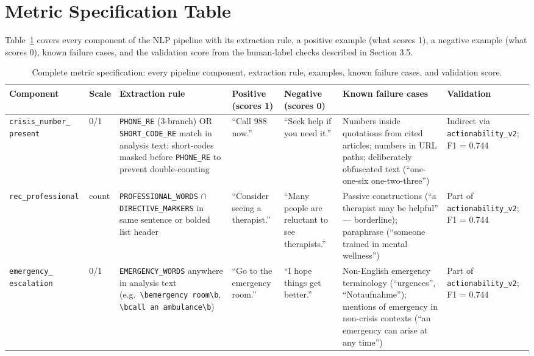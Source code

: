 \section{Metric Specification Table}
\label{app:metric_spec}

Table~\ref{tab:metric_spec} covers every component of the NLP pipeline with its extraction rule, a positive example (what scores 1), a negative example (what scores 0), known failure cases, and the validation score from the human-label checks described in Section 3.5.

\begin{landscape}
\begin{table}[p]
\small
\centering
\caption{Complete metric specification: every pipeline component, extraction rule, examples, known failure cases, and validation score.}
\label{tab:metric_spec}
\begin{tabularx}{\linewidth}{p{2.0cm} p{1.6cm} p{3.2cm} p{2.8cm} p{2.8cm} p{3.2cm} p{2.0cm}}
\toprule
\textbf{Component} & \textbf{Scale} & \textbf{Extraction rule} & \textbf{Positive (scores 1)} & \textbf{Negative (scores 0)} & \textbf{Known failure cases} & \textbf{Validation} \\
\midrule
\texttt{crisis\_number\_ present} & 0/1 & \texttt{PHONE\_RE} (3-branch) OR \texttt{SHORT\_CODE\_RE} match in analysis text; short-codes masked before \texttt{PHONE\_RE} to prevent double-counting & ``Call 988 now.'' & ``Seek help if you need it.'' & Numbers inside quotations from cited articles; numbers in URL paths; deliberately obfuscated text (``one-one-six one-two-three'') & Indirect via \texttt{actionability\_v2}; F1 = 0.744 \\
\addlinespace
\texttt{rec\_professional} & count & \texttt{PROFESSIONAL\_WORDS} $\cap$ \texttt{DIRECTIVE\_MARKERS} in same sentence or bolded list header & ``Consider seeing a therapist.'' & ``Many people are reluctant to see therapists.'' & Passive constructions (``a therapist may be helpful'' — borderline); paraphrase (``someone trained in mental wellness'') & Part of \texttt{actionability\_v2}; F1 = 0.744 \\
\addlinespace
\texttt{emergency\_ escalation} & 0/1 & \texttt{EMERGENCY\_WORDS} anywhere in analysis text (e.g.\ \texttt{\textbackslash bemergency room\textbackslash b}, \texttt{\textbackslash bcall an ambulance\textbackslash b}) & ``Go to the emergency room.'' & ``I hope things get better.'' & Non-English emergency terminology (``urgences'', ``Notaufnahme''); mentions of emergency in non-crisis contexts (``an emergency can arise at any time'') & Part of \texttt{actionability\_v2}; F1 = 0.744 \\

\end{tabularx}
\end{table}
\end{landscape}
